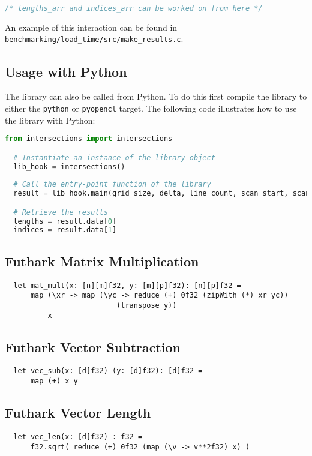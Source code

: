 \begin{appendices}
\begin{simplebox}
\begin{lstlisting}[language=C]
  /* lengths_arr and indices_arr can be worked on from here */
        \end{lstlisting}
    \end{simplebox}
    An example of this interaction can be found in \texttt{benchmarking/load\_time/src/make\_results.c}.

    \subsection*{Usage with Python}
    The library can also be called from Python. To do this first compile the library to either the \texttt{python} or \texttt{pyopencl} target. The following code illustrates how to use the library with Python:
    \begin{simplebox}
      \begin{lstlisting}[language=Python]
  from intersections import intersections

  # Instantiate an instance of the library object
  lib_hook = intersections()
  
  # Call the entry-point function of the library 
  result = lib_hook.main(grid_size, delta, line_count, scan_start, scan_end, scan_step)

  # Retrieve the results
  lengths = result.data[0]
  indices = result.data[1]
      \end{lstlisting}  
    \end{simplebox}

    \subsection*{Futhark Matrix Multiplication}
    \begin{simplebox}
    \begin{lstlisting}
  let mat_mult(x: [n][m]f32, y: [m][p]f32): [n][p]f32 =
      map (\xr -> map (\yc -> reduce (+) 0f32 (zipWith (*) xr yc))
                          (transpose y))
          x
    \end{lstlisting}
    \end{simplebox}

    \subsection*{Futhark Vector Subtraction}
    \begin{simplebox}
    \begin{lstlisting}
  let vec_sub(x: [d]f32) (y: [d]f32): [d]f32 =
      map (+) x y
    \end{lstlisting}
    \end{simplebox}

    \subsection*{Futhark Vector Length}
    \begin{simplebox}
    \begin{lstlisting}
  let vec_len(x: [d]f32) : f32 =
      f32.sqrt( reduce (+) 0f32 (map (\v -> v**2f32) x) )
    \end{lstlisting}
    \end{simplebox}

\end{appendices}